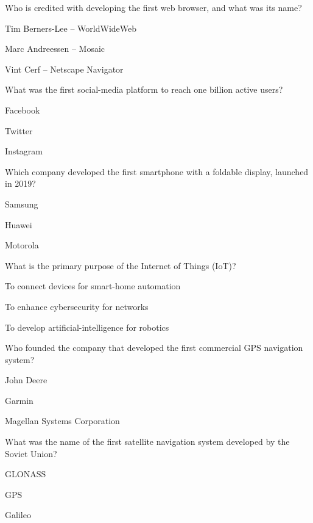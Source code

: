 \begin{enhancedmcq}{Who is credited with developing the first web browser, and what was its name?}
\item Tim Berners-Lee – WorldWideWeb
\item Marc Andreessen – Mosaic
\item Vint Cerf – Netscape Navigator

\end{enhancedmcq}
\begin{enhancedmcq}{What was the first social-media platform to reach one billion active users?}
\item Facebook
\item Twitter
\item Instagram

\end{enhancedmcq}
\begin{enhancedmcq}{Which company developed the first smartphone with a foldable display, launched in 2019?}
\item Samsung
\item Huawei
\item Motorola

\end{enhancedmcq}
\begin{enhancedmcq}{What is the primary purpose of the Internet of Things (IoT)?}
\item To connect devices for smart-home automation
\item To enhance cybersecurity for networks
\item To develop artificial-intelligence for robotics

\end{enhancedmcq}
\begin{enhancedmcq}{Who founded the company that developed the first commercial GPS navigation system?}
\item John Deere
\item Garmin
\item Magellan Systems Corporation

\end{enhancedmcq}
\begin{enhancedmcq}{What was the name of the first satellite navigation system developed by the Soviet Union?}
\item GLONASS
\item GPS
\item Galileo

\end{enhancedmcq}
